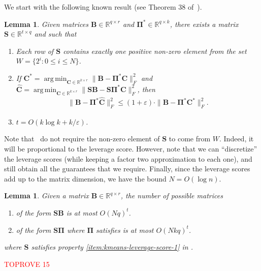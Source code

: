 \documentclass[11pt]{article}
\makeatletter
\DeclareMathOperator*{\argmin}{arg\,min}
\theoremstyle{plain}
\newtheorem{lemma}[theorem]{Lemma}
\theoremstyle{plain}
\theoremstyle{definition}
\theoremstyle{plain}
\theoremstyle{remark}
\newenvironment{proof}[1][\protect\proofname]{\par
	\normalfont\topsep6\p@\@plus6\p@\relax
	\trivlist
	\itemindent\parindent
	\item[\hskip\labelsep\scshape #1]\ignorespaces
}{\endtrivlist\@endpefalse
}
\providecommand{\proofname}{Proof}
\newcommand{\RR}{\mathbb{R}}
\makeatother
\begin{document}
We start with the following known result (see Theorem 38 of~\cite{clarkson2017low}).
\begin{lemma}
\label{lem:kmeans-leverage-score}
Given matrices $\bm{B}\in \RR^{q\times r}$ and $\bm{\Pi}^* \in \RR^{q\times k}$, there exists a matrix $\bm{S}\in \RR^{t\times q}$ and such that 
    \begin{enumerate}
   \item  \label{item:kmeans-leverage-score-1} Each row of $\bm{S}$ contains exactly one positive non-zero element from the set $W=\{2^{i}: 0\leq i\leq N\}$.
    \item  \label{item:kmeans-leverage-score-2} If $\bm{C}^*=\argmin_{\bm{C}\in \RR^{k\times r}}\|\bm{B}-\bm{\Pi}^*\bm{C}\|_F^2$ and $\widehat{\bm{C}}=\argmin_{\bm{C}\in \RR^{k\times r}}\|\bm{S}\bm{B}-\bm{S}\bm{\Pi}^*\bm{C}\|_F^2$, then 
    \begin{align}
        \|\bm{B}-\bm{\Pi}^*\widehat{\bm{C}}\|_F^2\leq (1+\varepsilon)\cdot \|\bm{B}-\bm{\Pi}^*\bm{C}^*\|_F^2.
    \end{align}
    \item $t=O(k\log k +k/\varepsilon)$.
    \end{enumerate}
\end{lemma}
Note that~\cite{clarkson2017low} do not require the non-zero element of $\bm{S}$ to come from $W$. Indeed, it will be proportional to the leverage score. However, note that we can ``discretize'' the leverage scores (while keeping a factor two approximation to each one), and still obtain all the guarantees that we require. Finally, since the leverage scores add up to the matrix dimension, we have the bound $N = O(\log n)$.

\begin{lemma}
    \label{lem:k-means-enum-smart}
   Given a matrix $\bm{B}\in \RR^{q\times r}$, the number of possible matrices
   \begin{enumerate}
       \item of the form $\bm{S}\bm{B}$ is at most $O(Nq)^t$.
       \item of the form $\bm{S}\bm{\Pi}$ where $\bm{\Pi}$ satisfies  is at most $O(Nkq)^t$.
   \end{enumerate}
where $\bm{S}$ satisfies property \ref{item:kmeans-leverage-score-1} in .
\end{lemma}
\begin{proof}\textcolor{red}{TOPROVE 15}\end{proof}
\end{document}
